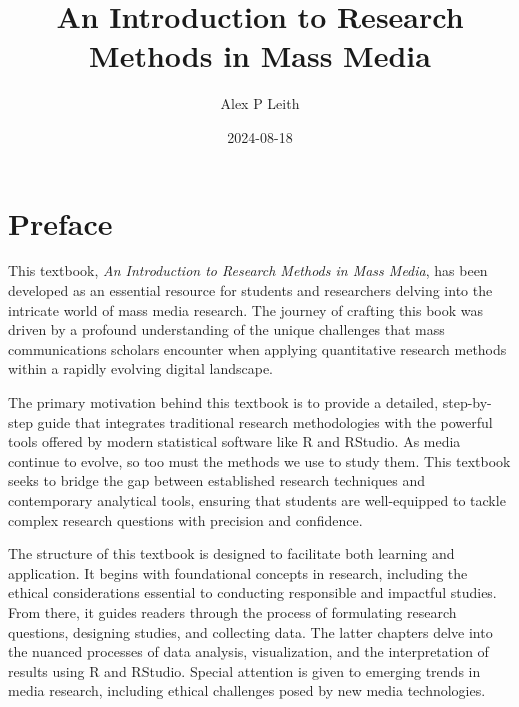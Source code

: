 \documentclass[
]{book}
\title{An Introduction to Research Methods in Mass Media}
\author{Alex P Leith}
\date{2024-08-18}
\begin{document}
\maketitle

{
\setcounter{tocdepth}{1}
\tableofcontents
}
\chapter{Preface}\label{preface}

This textbook, \emph{An Introduction to Research Methods in Mass Media}, has been developed as an essential resource for students and researchers delving into the intricate world of mass media research. The journey of crafting this book was driven by a profound understanding of the unique challenges that mass communications scholars encounter when applying quantitative research methods within a rapidly evolving digital landscape.

The primary motivation behind this textbook is to provide a detailed, step-by-step guide that integrates traditional research methodologies with the powerful tools offered by modern statistical software like R and RStudio. As media continue to evolve, so too must the methods we use to study them. This textbook seeks to bridge the gap between established research techniques and contemporary analytical tools, ensuring that students are well-equipped to tackle complex research questions with precision and confidence.

The structure of this textbook is designed to facilitate both learning and application. It begins with foundational concepts in research, including the ethical considerations essential to conducting responsible and impactful studies. From there, it guides readers through the process of formulating research questions, designing studies, and collecting data. The latter chapters delve into the nuanced processes of data analysis, visualization, and the interpretation of results using R and RStudio. Special attention is given to emerging trends in media research, including ethical challenges posed by new media technologies.
\end{document}
